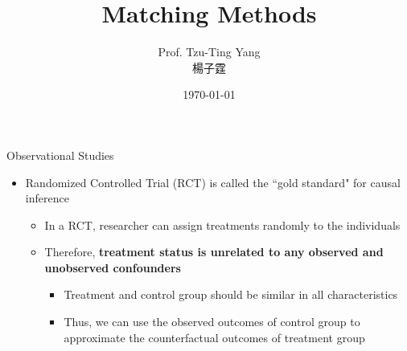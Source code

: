 \documentclass[dvipsnames,hyperref={pdfpagelabels=false}]{beamer}
\title[]  
{Matching Methods}
\author 
{Prof. Tzu-Ting Yang  \\ 楊子霆}
\institute{Institute of Economics, Academia Sinica  \\ 中央研究院經濟研究所}
\date
{\today}
\begin{document}
\begin{frame}{}
 \titlepage
\end{frame}






\begin{frame}{Observational Studies}
	\begin{itemize} 
		\item Randomized Controlled Trial (RCT) is called the ``gold standard" for causal inference 
		\vspace{0.3cm}
			\begin{itemize} 
		\item In a RCT, researcher can assign treatments randomly to the individuals
		\vspace{0.3cm}
		\item Therefore, \textbf{treatment status is unrelated to any observed and unobserved confounders}
					\begin{itemize} 
			\vspace{0.3cm}
		\item Treatment and control group should be similar in all characteristics
					\vspace{0.3cm}
		\item Thus, we can use the observed outcomes of control group to approximate the counterfactual outcomes of treatment group		
					\end{itemize}
			\end{itemize}
		
	\end{itemize}
\end{frame}
\end{document}
